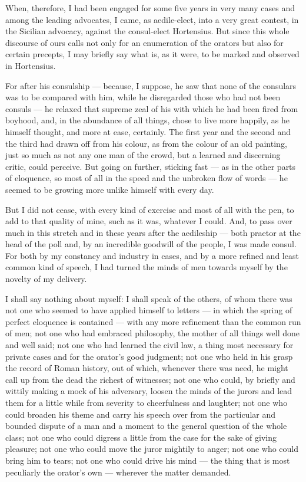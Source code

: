  When, therefore, I had been engaged for some five years in very many cases and among the leading advocates, I came, as aedile-elect, into a very great contest, in the Sicilian advocacy, against the consul-elect Hortensius. But since this whole discourse of ours calls not only for an enumeration of the orators but also for certain precepts, I may briefly say what is, as it were, to be marked and observed in Hortensius.

 For after his consulship — because, I suppose, he saw that none of the consulars was to be compared with him, while he disregarded those who had not been consuls — he relaxed that supreme zeal of his with which he had been fired from boyhood, and, in the abundance of all things, chose to live more happily, as he himself thought, and more at ease, certainly. The first year and the second and the third had drawn off from his colour, as from the colour of an old painting, just so much as not any one man of the crowd, but a learned and discerning critic, could perceive. But going on further, sticking fast — as in the other parts of eloquence, so most of all in the speed and the unbroken flow of words — he seemed to be growing more unlike himself with every day.

 But I did not cease, with every kind of exercise and most of all with the pen, to add to that quality of mine, such as it was, whatever I could. And, to pass over much in this stretch and in these years after the aedileship — both praetor at the head of the poll and, by an incredible goodwill of the people, I was made consul. For both by my constancy and industry in cases, and by a more refined and least common kind of speech, I had turned the minds of men towards myself by the novelty of my delivery.

 I shall say nothing about myself: I shall speak of the others, of whom there was not one who seemed to have applied himself to letters — in which the spring of perfect eloquence is contained — with any more refinement than the common run of men; not one who had embraced philosophy, the mother of all things well done and well said; not one who had learned the civil law, a thing most necessary for private cases and for the orator's good judgment; not one who held in his grasp the record of Roman history, out of which, whenever there was need, he might call up from the dead the richest of witnesses; not one who could, by briefly and wittily making a mock of his adversary, loosen the minds of the jurors and lead them for a little while from severity to cheerfulness and laughter; not one who could broaden his theme and carry his speech over from the particular and bounded dispute of a man and a moment to the general question of the whole class; not one who could digress a little from the case for the sake of giving pleasure; not one who could move the juror mightily to anger; not one who could bring him to tears; not one who could drive his mind — the thing that is most peculiarly the orator's own — wherever the matter demanded.

